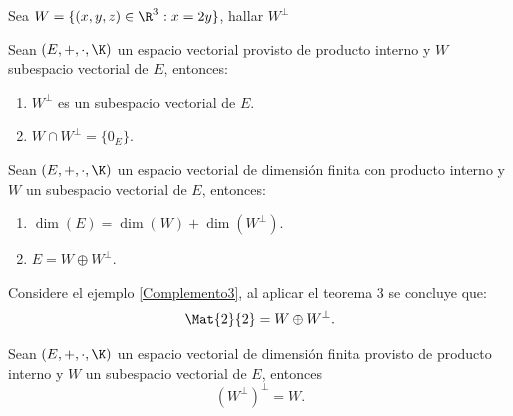 \documentclass[compacto,10pt]{pubciencias-notas}
\begin{document}
\begin{ejer}
    Sea $W=\{(x,y,z)\in\R^3: x=2y\}$, hallar $W^\perp$
\end{ejer}
\begin{teo}
Sean $(E,+,\cdot,\K)$ un espacio vectorial provisto de producto interno y
$W$ subespacio vectorial de $E$, entonces:
\begin{enumerate}
\item $W^\perp$ es un subespacio vectorial de $E$.
\item $W \cap W^\perp = \{0_{E}\}$.
\end{enumerate}
\end{teo}

\begin{teo}
Sean $(E,+,\cdot,\K)$ un espacio vectorial de dimensión finita con producto interno y $W$ un subespacio vectorial de $E$, entonces:
\begin{enumerate}
    \item $\dim(E) = \dim(W) + \dim(W^\perp)$.
    \item $E = W \oplus W^\perp$.
\end{enumerate}
\end{teo}


\begin{ejem}\hspace{0pt} Considere el ejemplo \ref{Complemento3}, al aplicar el teorema 3 se concluye que:
\[
    \Mat{2}{2} = W \oplus W^{\perp}.
\]
\end{ejem}

\begin{teo}
Sean $(E,+,\cdot,\K)$ un espacio vectorial de dimensión finita provisto de producto interno y $W$ un subespacio vectorial de $E$, entonces 
\[
    \left(W^{\perp}\right)^{\perp} =  W.
\]
\end{teo}
\end{document}
